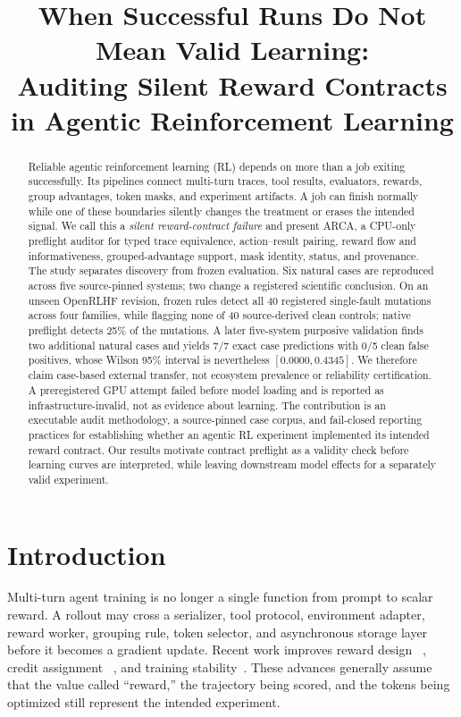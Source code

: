 \documentclass[10pt]{article}
\title{When Successful Runs Do Not Mean Valid Learning:\\
Auditing Silent Reward Contracts in Agentic Reinforcement Learning}
\date{}
\newcommand{\arca}{\textsc{ARCA}}
\begin{document}
\maketitle

\begin{abstract}
Reliable agentic reinforcement learning (RL) depends on more than a job
exiting successfully.  Its pipelines connect multi-turn traces, tool
results, evaluators, rewards, group advantages, token masks, and experiment
artifacts.  A job can finish normally while one of these boundaries silently
changes the treatment or erases the intended signal.  We call this a
\emph{silent reward-contract failure} and present \arca, a CPU-only preflight
auditor for typed trace equivalence, action--result pairing, reward flow and
informativeness, grouped-advantage support, mask identity, status, and
provenance.  The study separates discovery from frozen evaluation.  Six
natural cases are reproduced across five source-pinned systems; two change a
registered scientific conclusion.  On an unseen OpenRLHF revision, frozen
rules detect all 40 registered single-fault mutations across four families,
while flagging none of 40 source-derived clean controls; native preflight
detects 25\% of the mutations.  A later five-system purposive validation finds
two additional natural cases and yields 7/7 exact case predictions with 0/5
clean false positives, whose Wilson 95\% interval is nevertheless
$[0.0000,0.4345]$.  We therefore claim case-based external transfer, not
ecosystem prevalence or reliability certification.  A preregistered GPU
attempt failed before model loading and is reported as infrastructure-invalid,
not as evidence about learning.  The contribution is an executable audit
methodology, a source-pinned case corpus, and fail-closed reporting practices
for establishing whether an agentic RL experiment implemented its intended
reward contract.  Our results motivate contract preflight as a validity check
before learning curves are interpreted, while leaving downstream model effects
for a separately valid experiment.
\end{abstract}

\section{Introduction}

Multi-turn agent training is no longer a single function from prompt to scalar
reward.  A rollout may cross a serializer, tool protocol, environment adapter,
reward worker, grouping rule, token selector, and asynchronous storage layer
before it becomes a gradient update.  Recent work improves reward design
~\citep{zhang2026cm2,modecrua2026irc}, credit assignment
~\citep{zhang2026credit}, and training stability~\citep{wang2025ragen}.  These
advances generally assume that the value called ``reward,'' the trajectory
being scored, and the tokens being optimized still represent the intended
experiment.
\end{document}
